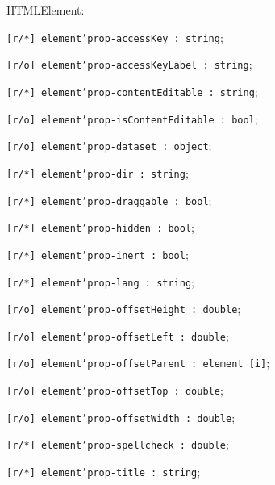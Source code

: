 \begin{icItems}
	\item HTMLElement:
	\begin{icItems}
		\item \texttt{[r/*] element'prop-accessKey : string};
		\item \texttt{[r/o] element'prop-accessKeyLabel : string};
		\item \texttt{[r/*] element'prop-contentEditable : string};
		\item \texttt{[r/o] element'prop-isContentEditable : bool};
		\item \texttt{[r/o] element'prop-dataset : object};
		\item \texttt{[r/*] element'prop-dir : string};
		\item \texttt{[r/*] element'prop-draggable : bool};
		\item \texttt{[r/*] element'prop-hidden : bool};
		\item \texttt{[r/*] element'prop-inert : bool};
		\item \texttt{[r/*] element'prop-lang : string};
		\item \texttt{[r/o] element'prop-offsetHeight : double};
		\item \texttt{[r/o] element'prop-offsetLeft : double};
		\item \texttt{[r/o] element'prop-offsetParent : element [i]};
		\item \texttt{[r/o] element'prop-offsetTop : double};
		\item \texttt{[r/o] element'prop-offsetWidth : double};
		\item \texttt{[r/*] element'prop-spellcheck : double};
		\item \texttt{[r/*] element'prop-title : string};
	\end{icItems}
	

\end{icItems}
